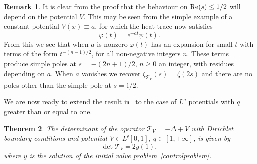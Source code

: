 \documentclass[11pt]{article}
\theoremstyle{plain}
\newtheorem{theorem}{Theorem}
\theoremstyle{definition}
\newtheorem{remark}[theorem]{Remark}
\newcommand{\ttt}{\mathscr{T}}
\let\balpha q
\begin{document}
\begin{remark}
It is clear from the proof that the behaviour on $\re(s)\leq 1/2$ will depend on the potential $V$. This may be seen from the simple example of a constant
potential $V(x) \equiv a$, for which the heat trace now satisfies
\[
\varphi(t) = e^{-a t}\psi(t).
\]
From this we see that when $a$ is nonzero $\varphi(t)$ has an expansion for small $t$ with terms of the form $t^{-(n-1)/2}$, for all non-negative
integers $n$. These terms produce simple poles at $s=-(2n+1)/2$, $n\geq 0$ an integer, with residues depending on $a$. When $a$ vanishes
we recover $\zeta_{\ttt_V}(s) = \zeta(2s)$ and there are no poles other than the simple pole at $s=1/2$.
\end{remark}

We are now ready to extend the result in~\cite{Levit-Smilansky} to the case of
$L^{\balpha}$ potentials with $\balpha$ greater than or equal to one.
\begin{theorem} \label{thm0}
The determinant of the operator $\ttt_V =-\Delta + V$ with Dirichlet boundary
conditions and potential $V\in L^\balpha[0,1]$, $\balpha \in[1,+\infty]$,
is given by
\begin{equation}\label{eq:dety1}
\det\ttt_V = 2y(1),
\end{equation}
where $y$ is the solution of the initial value problem~\eqref{controlproblem}.
\end{theorem}
\end{document}
